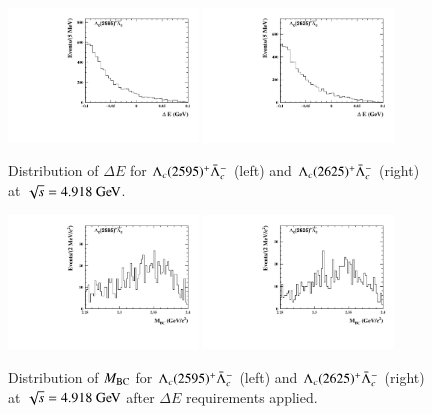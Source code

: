 \begin{figure}[H]\centering
    \includegraphics[width=0.45\textwidth]{figure/app_lcst/output_Lc2595_4914_deltaE.pdf}
    \includegraphics[width=0.45\textwidth]{figure/app_lcst/output_Lc2625_4914_deltaE.pdf}
    \caption{Distribution of $\Delta E$ for  $\Lambda_c(2595)^+\bar{\Lambda}_{c}^{-}$ (left) and $\Lambda_c(2625)^+\bar{\Lambda}_{c}^{-}$ (right) at $\sqrt{s} = 4.918\gev$.}
\label{fig:mc_lcst_deltaE}
\end{figure}

\begin{figure}[H]\centering
    \includegraphics[width=0.45\textwidth]{figure/app_lcst/output_Lc2595_4914_mBC.pdf}
    \includegraphics[width=0.45\textwidth]{figure/app_lcst/output_Lc2625_4914_mBC.pdf}
    \caption{Distribution of $M_{\rm{BC}}$ for  $\Lambda_c(2595)^+\bar{\Lambda}_{c}^{-}$ (left) and $\Lambda_c(2625)^+\bar{\Lambda}_{c}^{-}$ (right) at $\sqrt{s} = 4.918\gev$ after $\Delta E$ requirements applied.}
\label{fig:mc_lcst_mbc}
\end{figure}


